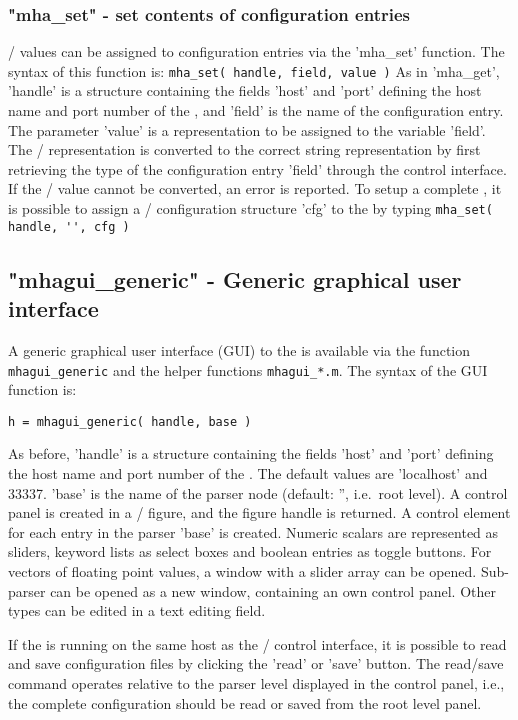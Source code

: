 \subsubsection{"mha\_set" - set contents of \mha{} configuration entries}

\Octave{}/ \Matlab{} values can be assigned to \mha{} configuration entries via the
'mha\_set' function.
%
The syntax of this function is:
\verb!mha_set( handle, field, value )!
%
As in 'mha\_get', 'handle' is a structure containing the fields 'host'
and 'port' defining the host name and port number of the \mhad{}, and
'field' is the name of the \mha{} configuration entry.
%
The parameter 'value' is a \Matlab{} representation to be assigned to
the variable 'field'.
%
The \Octave{}/ \Matlab{} representation is converted to the correct \mha{} string
representation by first retrieving the type of the configuration entry
'field' through the control interface.
%
If the \Octave{}/ \Matlab{} value cannot be converted, an error is reported.
%
To setup a complete \mha{}, it is possible to assign a \Octave{}/ \Matlab{}
configuration structure 'cfg' to the \mha{} by typing
\verb!mha_set( handle, '', cfg )!

\subsection{"mhagui\_generic" - Generic graphical user interface}
\label{sec:mhagui_generic}

A generic graphical user interface (GUI) to the \mhad{} is available
via the function \verb!mhagui_generic! and the helper functions
\verb!mhagui_*.m!.
%
The syntax of the GUI function is:
\begin{verbatim}
h = mhagui_generic( handle, base )
\end{verbatim}
%
As before, 'handle' is a structure containing the fields 'host' and
'port' defining the host name and port number of the \mhad{}. The
default values are 'localhost' and 33337.
%
'base' is the name of the \mha{} parser node (default: '', i.e.\ root level).
%
A control panel is created in a \Octave{}/ \Matlab{} figure, and the figure
handle is returned.
%
A control element for each entry in the parser 'base' is created.
%
Numeric scalars are represented as sliders, keyword lists as select
boxes and boolean entries as toggle buttons.
%
For vectors of floating point values, a window with a slider array can
be opened.
%
Sub-parser can be opened as a new window, containing an own control
panel.
%
Other types can be edited in a text editing field.

If the \mha{} is running on the same host as the \Octave{}/ \Matlab{} control
interface, it is possible to read and save \mha{} configuration files by
clicking the 'read' or 'save' button. The read/save command operates
relative to the \mha{} parser level displayed in the control panel, i.e.,
the complete configuration should be read or saved from the root level
panel.


